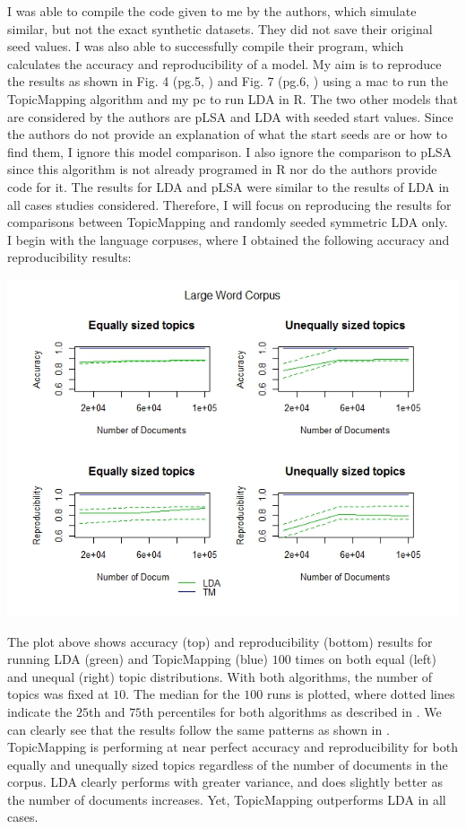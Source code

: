 \documentclass[12pt]{article}
\begin{document}
\noindent I was able to compile the code given to me by the authors, which simulate similar, but not the exact synthetic datasets. They did not save their original seed values. I was also able to successfully compile their program, which calculates the accuracy and reproducibility of a model. My aim is to reproduce the results as shown in Fig. 4 (pg.5, \cite{main}) and Fig. 7 (pg.6, \cite{main}) using a mac to run the TopicMapping algorithm and my pc to run LDA in R. The two other models that are considered by the authors are pLSA and LDA with seeded start values. Since the authors do not provide an explanation of what the start seeds are or how to find them, I ignore this model comparison. I also ignore the comparison to pLSA since this algorithm is not already programed in R nor do the authors provide code for it. The results for LDA and pLSA were similar to the results of LDA in all cases studies considered. Therefore, I will focus on reproducing the results for comparisons between TopicMapping and randomly seeded symmetric LDA only.
\\

\noindent I begin with the language corpuses, where I obtained the following accuracy and reproducibility results:
\vspace{2mm}
\begin{center}
	\includegraphics[scale=0.7]{Images/plot_largeC.jpeg}
\end{center} 
\vspace{2mm}
\noindent The plot above shows accuracy (top) and reproducibility (bottom) results for running LDA (green) and TopicMapping (blue) $100$ times on both equal (left) and unequal (right) topic distributions. With both algorithms, the number of topics was fixed at $10$. The median for the $100$ runs is plotted, where dotted lines indicate the $25$th and $75$th percentiles for both algorithms as described in \cite{main}. We can clearly see that the results follow the same patterns as shown in \cite{main}. TopicMapping is performing at near perfect accuracy and reproducibility for both equally and unequally sized topics regardless of the number of documents in the corpus. LDA clearly performs with greater variance, and does slightly better as the number of documents increases. Yet, TopicMapping outperforms LDA in all cases.
\\
\end{document}
